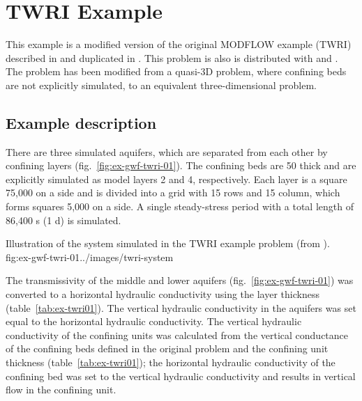 \section{\mf TWRI Example}

This example is a modified version of the original MODFLOW example (TWRI) described in \cite{modflow88} and duplicated in \cite{harbaugh1996user}. This problem is also is distributed with \mff \citep{modflow2005} and \mf \citep{modflow6software}. The problem has been modified from a quasi-3D problem, where confining beds are not explicitly simulated, to an equivalent three-dimensional problem.

\subsection{Example description}
There are three simulated aquifers, which are separated from each other by confining layers (fig.~\ref{fig:ex-gwf-twri-01}). The confining beds are 50 \si{\feet} thick and are explicitly simulated as model layers 2 and 4, respectively. Each layer is a square 75,000 \si{\feet} on a side and is divided into a grid with 15 rows and 15 column, which forms squares 5,000 \si{\feet} on a side. A single steady-stress period with a total length of 86,400 \si{\second} (1 \si{\day}) is simulated.

\begin{StandardFigure}{
                                     Illustration of the system simulated in the TWRI example problem (from \cite{modflow88}).
                                     }{fig:ex-gwf-twri-01}{../images/twri-system}
\end{StandardFigure}                                 

The transmissivity of the middle and lower aquifers (fig.~\ref{fig:ex-gwf-twri-01}) was converted to a horizontal hydraulic conductivity using the layer thickness (table~\ref{tab:ex-twri01}). The vertical hydraulic conductivity in the aquifers was set equal to the horizontal hydraulic conductivity. The vertical hydraulic conductivity of the confining units was calculated from the vertical conductance of the confining beds defined in the original problem and the confining unit thickness (table~\ref{tab:ex-twri01}); the horizontal hydraulic conductivity of the confining bed was set to the vertical hydraulic conductivity and results in vertical flow in the confining unit.


